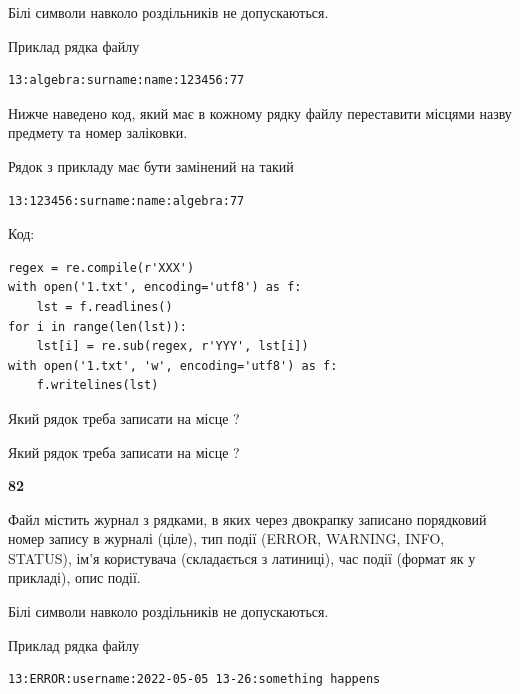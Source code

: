 Білі символи навколо роздільників не допускаються.

Приклад рядка файлу



\begin{verbatim}
13:algebra:surname:name:123456:77
\end{verbatim}


Нижче наведено код, який має в кожному рядку файлу переставити місцями назву предмету та номер заліковки.

Рядок з прикладу має бути замінений на такий



\begin{verbatim}
13:123456:surname:name:algebra:77
\end{verbatim}




Код:



\begin{verbatim}
regex = re.compile(r'XXX')
with open('1.txt', encoding='utf8') as f:
    lst = f.readlines()
for i in range(len(lst)):
    lst[i] = re.sub(regex, r'YYY', lst[i])
with open('1.txt', 'w', encoding='utf8') as f:
    f.writelines(lst)
\end{verbatim}







Який рядок треба записати на місце  ?\par
\vspace{5mm}


Який рядок треба записати на місце  ?\par


\newpage

{\begin {center}\textbf{ 82}\end {center}}\par
Файл  містить журнал з рядками, в яких через двокрапку записано поряд\-ко\-вий номер запису в журналі (ціле), тип події (ERROR, WARNING, INFO, STATUS), ім'я користувача (складається з латиниці), час події (фор\-мат як у прикладі), опис події.

Білі символи навколо роздільників не допускаються.

Приклад рядка файлу



\begin{verbatim}
13:ERROR:username:2022-05-05 13-26:something happens
\end{verbatim}


